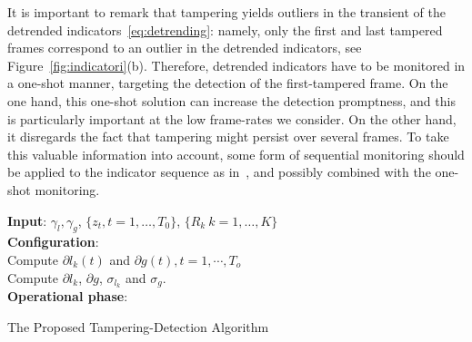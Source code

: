 \documentclass{llncs}
\begin{document}
It is important to remark that tampering yields outliers in the transient of the detrended indicators~\eqref{eq:detrending}: namely, only the first and last tampered frames correspond to an outlier in the detrended indicators, see Figure~\ref{fig:indicatori}(b). Therefore, detrended indicators have to be monitored in a one-shot manner, targeting the detection of the first-tampered frame. On the one hand, this one-shot solution can increase the detection promptness, and this is particularly important at the low frame-rates we consider. On the other hand, it disregards the fact that tampering might persist over several frames. To take this valuable information into account, some form of sequential monitoring should be applied to the indicator sequence as in~\cite{alippi2010detecting}, and possibly combined with the one-shot monitoring.

\begin{algorithm}[t]
	\LinesNumbered
	\textbf{Input}: $\gamma_l, \gamma_g$, $\{z_t, t = 1, \dots, T_{0}\}$, $\{R_k \ k=1,\dots,K\}$ \\
	\textbf{Configuration}:\\
	 Compute $\partial l_k(t)$ and $\partial g(t), t = 1, \cdots, T_o$\\ 
	 Compute $\partial l_k$, $\partial g$, $\sigma_{l_k}$ and $\sigma_{g}$.\\
	
	\textbf{Operational phase}:\\
	    
	\caption{The Proposed Tampering-Detection Algorithm}
	\label{alg:DISPL}
\end{algorithm}
\end{document}
